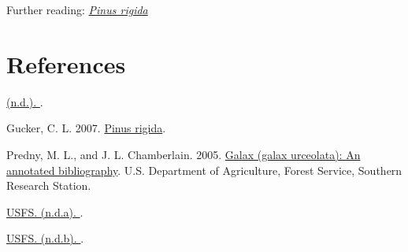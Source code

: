 \documentclass[
]{article}
\newlength{\cslhangindent}
\newlength{\cslentryspacingunit} %
\newenvironment{CSLReferences}[2] %
 {%
  \setlength{\parindent}{0pt}
  \ifodd #1
  \let\oldpar\par
  \def\par{\hangindent=\cslhangindent\oldpar}
  \fi
  \setlength{\parskip}{#2\cslentryspacingunit}
 }%
 {}
\begin{document}
Further reading: \href{https://www.fs.fed.us/database/feis/plants/tree/pinrig/all.html\#Cone\%20survival\%20and\%20seedling\%20establishment:}{\emph{Pinus rigida}}

\hypertarget{references}{%
\section*{References}\label{references}}

\hypertarget{refs}{}
\begin{CSLReferences}{1}{0}
\leavevmode{}%
\href{https://plants.ces.ncsu.edu/plants/gaylussacia-baccata/}{(n.d.). }.

\leavevmode{}%
Gucker, C. L. 2007. \href{https://www.fs.fed.us/database/feis/plants/tree/pinrig/all.html\#Cone\%20survival\%20and\%20seedling\%20establishment:}{Pinus rigida}.

\leavevmode{}%
Predny, M. L., and J. L. Chamberlain. 2005. \href{https://www.srs.fs.usda.gov/pubs/gtr/gtr_srs087.pdf}{Galax (galax urceolata): An annotated bibliography}. U.S. Department of Agriculture, Forest Service, Southern Research Station.

\leavevmode{}%
\href{https://www.fs.fed.us/wildflowers/beauty/mycotrophic/monotropa_hypopitys.shtml}{USFS. (n.d.a). }.

\leavevmode{}%
\href{https://www.fs.fed.us/wildflowers/beauty/mycotrophic/monotropa_uniflora.shtml}{USFS. (n.d.b). }.

\end{CSLReferences}
\end{document}
